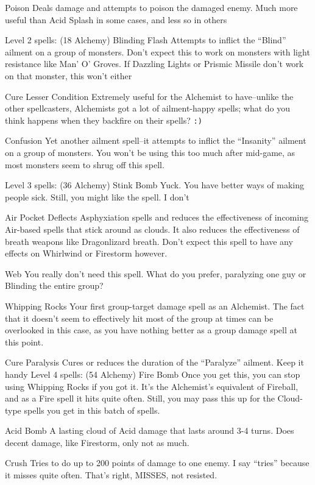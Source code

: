 \documentclass[12pt]{article}
\begin{document}
Poison Deals damage and attempts to poison the damaged enemy. Much more
useful than Acid Splash in some cases, and less so in others

Level 2 spells: (18 Alchemy) Blinding Flash Attempts to inflict the
``Blind'' ailment on a group of monsters. Don't expect this to work on
monsters with light resistance like Man' O' Groves. If Dazzling Lights
or Prismic Missile don't work on that monster, this won't either

Cure Lesser Condition Extremely useful for the Alchemist to have--unlike
the other spellcasters, Alchemists got a lot of ailment-happy spells;
what do you think happens when they backfire on their spells? \texttt{:)}

Confusion Yet another ailment spell--it attempts to inflict the
``Insanity'' ailment on a group of monsters. You won't be using this too
much after mid-game, as most monsters seem to shrug off this spell.

Level 3 spells: (36 Alchemy) Stink Bomb Yuck. You have better ways of
making people sick. Still, you might like the spell. I don't

Air Pocket Deflects Asphyxiation spells and reduces the effectiveness of
incoming Air-based spells that stick around as clouds. It also reduces
the effectiveness of breath weapons like Dragonlizard breath. Don't
expect this spell to have any effects on Whirlwind or Firestorm however.

Web You really don't need this spell. What do you prefer, paralyzing one
guy or Blinding the entire group?

Whipping Rocks Your first group-target damage spell as an Alchemist. The
fact that it doesn't seem to effectively hit most of the group at times
can be overlooked in this case, as you have nothing better as a group
damage spell at this point.

Cure Paralysis Cures or reduces the duration of the ``Paralyze''
ailment. Keep it handy Level 4 spells: (54 Alchemy) Fire Bomb Once you
get this, you can stop using Whipping Rocks if you got it. It's the
Alchemist's equivalent of Fireball, and as a Fire spell it hits quite
often. Still, you may pass this up for the Cloud-type spells you get in
this batch of spells.

Acid Bomb A lasting cloud of Acid damage that lasts around 3-4 turns.
Does decent damage, like Firestorm, only not as much.

Crush Tries to do up to 200 points of damage to one enemy. I say
``tries'' because it misses quite often. That's right, MISSES, not
resisted.
\end{document}
